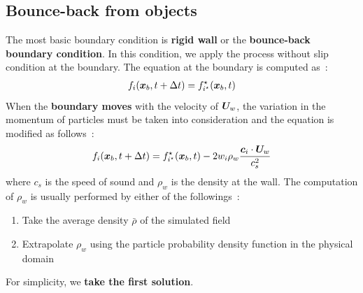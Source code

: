 \subsection{Bounce-back from objects}\label{boundary-wall-settings}
The most basic boundary condition is 
{\bf rigid wall} or the {\bf bounce-back boundary condition}.
In this condition, we apply the process without
slip condition at the boundary.
The equation at the boundary is computed as~\cite{succi2018lattice}:
\begin{equation}
\begin{aligned}
  f_i(\boldsymbol{x}_b, t + \Delta t) = f_{i^\star}^\star(\boldsymbol{x}_b, t)
\end{aligned}
\label{discretized-rigid-wall}
\end{equation}
When the {\bf boundary moves} with the velocity of
$\boldsymbol{U}_w$, the variation in the momentum of particles
must be taken into consideration and the equation is
modified as follows~\cite{succi2018lattice}:
\begin{equation}
  \begin{aligned}
    f_i(\boldsymbol{x}_b, t + \Delta t) = f_{i^\star}^\star (\boldsymbol{x}_b, t) - 
    2 w_i \rho_w \frac{
      \boldsymbol{c}_i \cdot \boldsymbol{U}_w
    }{c_s^2}
  \end{aligned}
  \label{discretized-moving-wall}
\end{equation}
where $c_s$ is the speed of sound and 
$\rho_w$ is the density at the wall.
The computation of $\rho_w$ is usually performed by
either of the followings~\cite{zou1997pressure, khajepor2019study}:
\begin{enumerate}
  \item Take the average density $\bar{\rho}$ of the simulated field
  \item Extrapolate $\rho_w$ using 
  the particle probability density function in the physical domain
\end{enumerate}
For simplicity, we {\bf take the first solution}.

